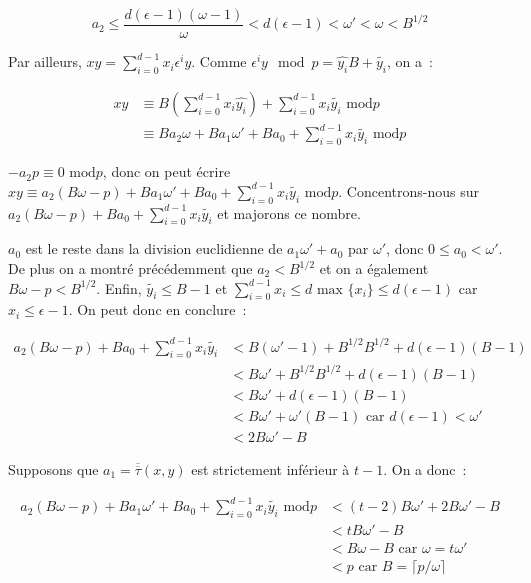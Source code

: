 		$$a_2 \leq \frac{d(\epsilon - 1)(\omega - 1)}{\omega} < d(\epsilon - 1) < \omega' < \omega < B^{1/2} $$
		
		Par ailleurs, $xy = \sum_{i=0}^{d-1} x_i \epsilon^i y$. Comme $\epsilon^i y\mod p = \hat{y_i} B + \tilde{y_i}$, on a~:
		
		\begin{align*}
        xy &\equiv B(\sum_{i=0}^{d-1} x_i \hat{y_i}) + \sum_{i=0}^{d-1} x_i \tilde{y_i} \text{\ mod} p \\
           &\equiv B a_2\omega + B a_1\omega' + B a_0 + \sum_{i=0}^{d-1} x_i \tilde{y_i} \text{\ mod} p
         \end{align*}
         
         $-a_2 p \equiv 0 \text{\ mod} p$, donc on peut écrire $xy \equiv a_2(B\omega - p) + B a_1\omega' + B a_0 + \sum_{i=0}^{d-1} x_i \tilde{y_i} \text{\ mod} p$. Concentrons-nous sur $a_2(B\omega - p) + B a_0 + \sum_{i=0}^{d-1} x_i \tilde{y_i}$ et majorons ce nombre.
         
         $a_0$ est le reste dans la division euclidienne de $a_1\omega' + a_0$ par $\omega'$, donc $0 \leq a_0 < \omega'$. De plus on a montré précédemment que $a_2 < B^{1/2}$ et on a également $B\omega - p < B^{1/2}$. Enfin, $\tilde{y_i} \leq B - 1$ et $\sum_{i=0}^{d-1} x_i \leq d \text{\ max $\{x_i\}$} \leq d(\epsilon - 1)$ car $x_i \leq \epsilon - 1$. On peut donc en conclure~:
         
         \begin{align*}
         a_2(B\omega - p) + B a_0 + \sum_{i=0}^{d-1} x_i \tilde{y_i} &< B(\omega' - 1) + B^{1/2}B^{1/2} + d(\epsilon - 1)(B - 1) \\
                                 &< B\omega' + B^{1/2}B^{1/2} + d(\epsilon - 1)(B - 1) \\
                                 &< B\omega' + d(\epsilon - 1)(B - 1) \\
                                 &< B\omega' + \omega'(B - 1) \text{\ car $d(\epsilon - 1) < \omega'$} \\
                                 &< 2B\omega' - B
         \end{align*}
         
         Supposons que $a_1 = \overline{\overline{\tau}}(x,y)$ est strictement inférieur à $t - 1$. On a donc~:
         
         \begin{align*}
         a_2(B\omega - p) + B a_1\omega' + B a_0 + \sum_{i=0}^{d-1} x_i \tilde{y_i} \text{\ mod} p &< (t - 2)B\omega' + 2B\omega' - B \\
                               &< tB\omega' - B \\
                               &< B\omega - B \text{\ car $\omega = t\omega'$} \\
                               &< p \text{\ car $B = \lceil p/\omega \rceil$}
         \end{align*}
         
